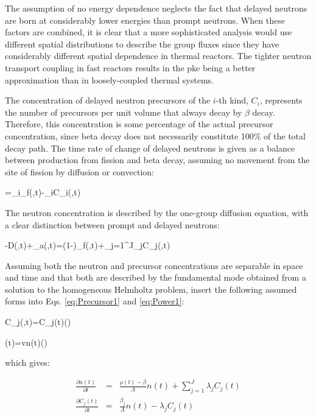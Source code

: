 The assumption of no energy dependence neglects the fact that delayed neutrons are born at considerably lower energies than prompt neutrons. When these factors are combined, it is clear that a more sophisticated analysis would use different spatial distributions to describe the group fluxes since they have considerably different spatial dependence in thermal reactors. The tighter neutron transport coupling in fast reactors results in the \gls{pke} being a better approximation than in loosely-coupled thermal systems.

The concentration of delayed neutron precursors of the \(i\)-th kind, \(C_i\), represents the number of precursors per unit volume that always decay by \(\beta\) decay. Therefore, this concentration is some percentage of the actual precursor concentration, since beta decay does not necessarily constitute 100\% of the total decay path. The time rate of change of delayed neutrons is given as a balance between production from fission and beta decay, assuming no movement from the site of fission by diffusion or convection:

\beq
\label{eq:Precursor1}
=\beta_i\nu\Sigma_f\phi(,t)-\lambda_iC_i(,t)
\eeq

The neutron concentration is described by the one-group diffusion equation, with a clear distinction between prompt and delayed neutrons:

\beq
\label{eq:Power1}
-\nabla\cdot\left\lbrack D\nabla\phi(,t)\right\rbrack+\Sigma_a\phi(,t)=(1-\beta)\nu\Sigma_f\phi(,t)+\sum_{j=1}^J\lambda_jC_j(,t)
\eeq

Assuming both the neutron and precursor concentrations are separable in space and time and that both are described by the fundamental mode obtained from a solution to the homogeneous Helmholtz problem, insert the following assumed forms into Eqs. \eqref{eq:Precursor1} and \eqref{eq:Power1}:

\beq
C_j(,t)=C_j(t)\psi()
\eeq

\beq
\phi(t)=vn(t)\psi()
\eeq

which gives:

\begin{subequations}
\label{eq:PKE}
\begin{eqnarray}
\frac{\partial n(t)}{\partial t}&=&\frac{\rho(t)-\beta}{\Lambda}n(t)+\sum_{j=1}^J\lambda_jC_j(t)\\
\frac{\partial C_j(t)}{\partial t}&=&\frac{\beta_j}{\Lambda}n(t)-\lambda_jC_j(t)
\end{eqnarray}
\end{subequations}

